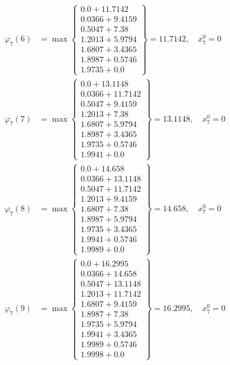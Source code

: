 \documentclass{article}
\begin{document}
\begin{align*}
\varphi_{7}(6) &= \max \left\{ \begin{array}{c}
0.0 + 11.7142 \\
 0.0366 + 9.4159 \\
 0.5047 + 7.38 \\
 1.2013 + 5.9794 \\
 1.6807 + 3.4365 \\
 1.8987 + 0.5746 \\
 1.9735 + 0.0
\end{array} \right\}=11.7142, \quad x_{7}^0=0\\
  
\varphi_{7}(7) &= \max \left\{ \begin{array}{c}
0.0 + 13.1148 \\
 0.0366 + 11.7142 \\
 0.5047 + 9.4159 \\
 1.2013 + 7.38 \\
 1.6807 + 5.9794 \\
 1.8987 + 3.4365 \\
 1.9735 + 0.5746 \\
 1.9941 + 0.0
\end{array} \right\}=13.1148, \quad x_{7}^0=0\\
  
\varphi_{7}(8) &= \max \left\{ \begin{array}{c}
0.0 + 14.658 \\
 0.0366 + 13.1148 \\
 0.5047 + 11.7142 \\
 1.2013 + 9.4159 \\
 1.6807 + 7.38 \\
 1.8987 + 5.9794 \\
 1.9735 + 3.4365 \\
 1.9941 + 0.5746 \\
 1.9989 + 0.0
\end{array} \right\}=14.658, \quad x_{7}^0=0\\
  
\varphi_{7}(9) &= \max \left\{ \begin{array}{c}
0.0 + 16.2995 \\
 0.0366 + 14.658 \\
 0.5047 + 13.1148 \\
 1.2013 + 11.7142 \\
 1.6807 + 9.4159 \\
 1.8987 + 7.38 \\
 1.9735 + 5.9794 \\
 1.9941 + 3.4365 \\
 1.9989 + 0.5746 \\
 1.9998 + 0.0
\end{array} \right\}=16.2995, \quad x_{7}^0=0\\
  

\end{align*}
\end{document}
